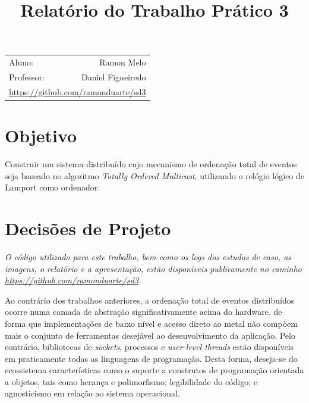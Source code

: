 \documentclass[a4paper,12pt]{article}
\title{Relatório do Trabalho Prático 3} %
\begin{document}
        \maketitle %

        \begin{center}
            \begin{tabular}{l r}
                Aluno: & Ramon Melo \\ %
                Professor: & Daniel Figueiredo \\ %
                \multicolumn{2}{r}{\url{https://github.com/ramonduarte/sd3}}
            \end{tabular}
        \end{center}

        
        \section{Objetivo}
        
            Construir um sistema distribuído cujo mecanismo de ordenação total de eventos seja baseado no algoritmo \emph{Totally Ordered Multicast}, utilizando o relógio lógico de Lamport como ordenador.
            
        
        \section{Decisões de Projeto}

            \emph{O código utilizado para este trabalho, bem como os logs dos estudos de caso, as imagens, o relatório e a apresentação, estão disponíveis publicamente no caminho \url{https://github.com/ramonduarte/sd3}}.
        
            \emph{}Ao contrário dos trabalhos anteriores, a ordenação total de eventos distribuídos ocorre numa camada de abstração significativamente acima do hardware, de forma que implementações de baixo nível e acesso direto ao metal não compõem mais o conjunto de ferramentas desejável ao desenvolvimento da aplicação.
            Pelo contrário, bibliotecas de \emph{sockets}, processos e \emph{user-level threads} estão disponíveis em praticamente todas as linguagens de programação.
            Desta forma, deseja-se do ecossistema características como o suporte a construtos de programação orientada a objetos, tais como herança e polimorfismo; legibilidade do código; e agnosticismo em relação ao sistema operacional.
            
\end{document}

